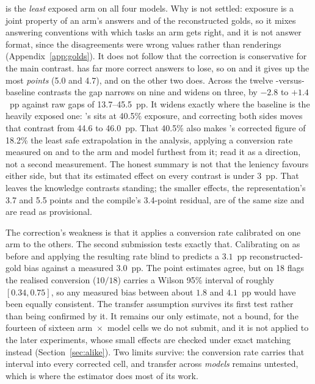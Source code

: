\armC{} is the \emph{least} exposed arm on all four models. Why is not
settled: exposure is a joint property of an arm's answers and of the
reconstructed golds, so it mixes answering conventions with which tasks an
arm gets right, and it is not answer format, since the disagreements were
wrong values rather than renderings (Appendix~\ref{app:golds}). It does not follow that the correction is
conservative for the main contrast. \armC{} has far more correct answers to
lose, so on \mGLM{} and \mGPT{} it gives up the most \emph{points} (5.0 and
4.7), and on the other two \armM{} does. Across the twelve \armC{}-versus-baseline
contrasts the gap narrows on nine and widens on three, by $-2.8$ to $+1.4$~pp
against raw gaps of 13.7--45.5~pp. It widens exactly where the baseline is
the heavily exposed one: \mSON{}'s \armM{} sits at 40.5\% exposure, and
correcting both sides moves that contrast from 44.6 to 46.0~pp. That 40.5\%
also makes \mSON{}'s corrected \armM{} figure of 18.2\% the least safe
extrapolation in the analysis, applying a conversion rate measured on
\armC{} and \mGLM{} to the arm and model furthest from it; read it as a
direction, not a second measurement. The honest summary is not that the
leniency favours either side, but that its estimated effect on every
contrast is under 3~pp. That leaves the knowledge contrasts standing; the
smaller effects, the representation's 3.7 and 5.5 points and the compile's
3.4-point residual, are of the same size and are read as provisional.

The correction's weakness is that it applies a conversion rate calibrated
on one arm to the others. The second submission tests exactly that.
Calibrating on \armC{} as before and applying the resulting rate blind to
\armM{} predicts a $3.1$~pp reconstructed-gold bias against a measured
$3.0$~pp. The point estimates agree, but on 18 flags the realised conversion
($10/18$) carries a Wilson 95\% interval of roughly $[0.34, 0.75]$, so any
measured bias between about $1.8$ and $4.1$~pp would have been equally
consistent. The transfer assumption survives its first test rather than
being confirmed by it. It remains our only estimate, not a bound, for the
fourteen of sixteen arm~$\times$~model cells we do not submit, and it is
not applied to the later experiments, whose small effects are checked
under exact matching instead (Section~\ref{sec:alike}). Two limits
survive: the conversion rate carries that interval into every corrected
cell, and transfer across \emph{models} remains untested, which is
where the estimator does most of its work.
